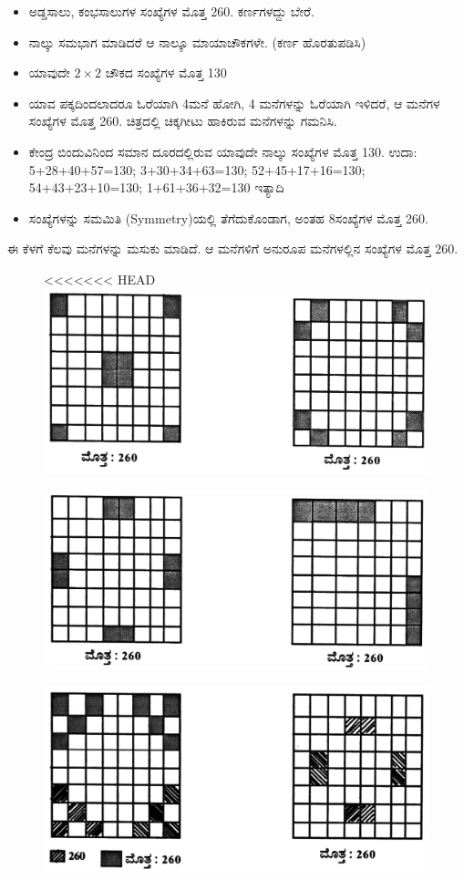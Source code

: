 \begin{itemize}
	\item ಅಡ್ಡಸಾಲು, ಕಂಭಸಾಲುಗಳ ಸಂಖ್ಯೆಗಳ ಮೊತ್ತ 260. ಕರ್ಣಗಳದ್ದು ಬೇರೆ.
	\item ನಾಲ್ಕು ಸಮಭಾಗ ಮಾಡಿದರೆ ಆ ನಾಲ್ಕೂ ಮಾಯಾಚೌಕಗಳೇ. (ಕರ್ಣ ಹೊರತು\-ಪಡಿಸಿ)
	\item ಯಾವುದೇ $2 \times 2$ ಚೌಕದ ಸಂಖ್ಯೆಗಳ ಮೊತ್ತ 130
	\item ಯಾವ ಪಕ್ಕದಿಂದಲಾದರೂ ಓರೆಯಾಗಿ 4ಮನೆ ಹೋಗಿ, 4 ಮನೆಗಳನ್ನು ಓರೆ\-ಯಾಗಿ ಇಳಿದರೆ, ಆ ಮನೆಗಳ ಸಂಖ್ಯೆಗಳ ಮೊತ್ತ 260. ಚಿತ್ರದಲ್ಲಿ ಚಿಕ್ಕಗೀಟು ಹಾಕಿರುವ ಮನೆಗಳನ್ನು ಗಮನಿಸಿ.
	\item ಕೇಂದ್ರ ಬಿಂದುವಿನಿಂದ ಸಮಾನ ದೂರದಲ್ಲಿರುವ ಯಾವುದೇ ನಾಲ್ಕು ಸಂಖ್ಯೆಗಳ ಮೊತ್ತ 130. ಉದಾ: 5+28+40+57=130; 3+30+34+63=130; 52+45+17+16=130; 54+43+23+10=130; 1+61+36+32=130 ಇತ್ಯಾದಿ
	\item ಸಂಖ್ಯೆಗಳನ್ನು ಸಮಮಿತಿ (Symmetry)ಯಲ್ಲಿ ತೆಗೆದುಕೊಂಡಾಗ, ಅಂತಹ 8\break ಸಂಖ್ಯೆಗಳ ಮೊತ್ತ 260.
\end{itemize}
ಈ ಕೆಳಗೆ ಕೆಲವು ಮನೆಗಳನ್ನು ಮಸುಕು ಮಾಡಿದೆ. ಆ ಮನೆಗಳಿಗೆ ಅನುರೂಪ ಮನೆಗಳಲ್ಲಿನ ಸಂಖ್ಯೆಗಳ ಮೊತ್ತ 260.
\begin{figure}[H]
<<<<<<< HEAD
\includegraphics{src/figures/chap7/fig7-3.jpg}
\end{figure}
\begin{figure}[H]
\includegraphics{src/figures/chap7/fig7-4.jpg}
\end{figure}
\begin{figure}[H]
\includegraphics{src/figures/chap7/fig7-5.jpg}
\end{figure}

